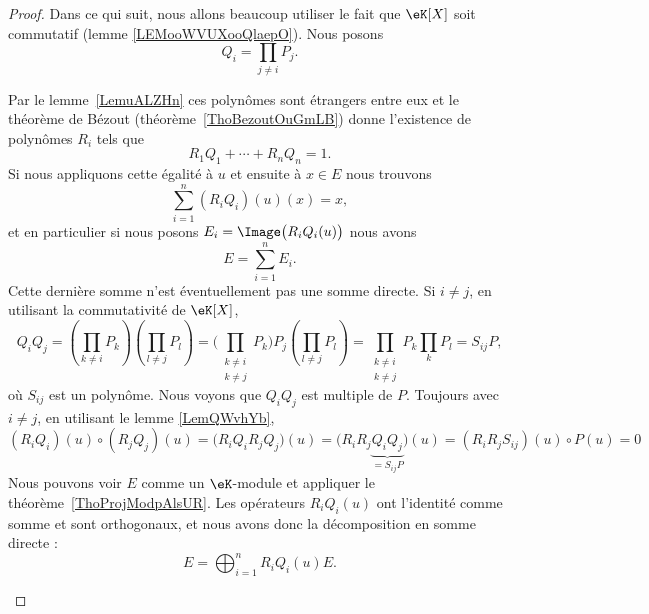 \begin{proof}
	Dans ce qui suit, nous allons beaucoup utiliser le fait que \( \eK[X]\) soit commutatif (lemme \ref{LEMooWVUXooQlaepO}). Nous posons
	\begin{equation}
		Q_i=\prod_{j\neq i}P_j.
	\end{equation}
	\begin{subproof}

		Par le lemme~\ref{LemuALZHn} ces polynômes sont étrangers entre eux et le théorème de Bézout (théorème~\ref{ThoBezoutOuGmLB}) donne l'existence de polynômes \( R_i\) tels que
		\begin{equation}        \label{EQooMMCVooRzlXpA}
			R_1Q_1+\cdots+R_nQ_n=1.
		\end{equation}
		Si nous appliquons cette égalité à \( u\) et ensuite à \( x\in E\) nous trouvons
		\begin{equation}        \label{EqqVcpUy}
			\sum_{i=1}^n(R_iQ_i)(u)(x)=x,
		\end{equation}
		et en particulier si nous posons \( E_i=\Image\big(R_iQ_i(u)\big)\) nous avons
		\begin{equation}
			E=\sum_{i=1}^nE_i.
		\end{equation}
		Cette dernière somme n'est éventuellement pas une somme directe.
		Si \( i\neq j\), en utilisant la commutativité de \( \eK[X]\),
		\begin{equation}
			Q_iQ_j=\left(\prod_{k\neq i}P_k\right)\left(\prod_{l\neq j}P_l\right)=\Big( \prod_{\substack{k\neq i\\k\neq j}}P_k \Big)P_j\left( \prod_{l\neq j}P_l \right)=\prod_{\substack{k\neq i\\k\neq j}}P_k\prod_kP_l=S_{ij}P,
		\end{equation}
		où \( S_{ij}\) est un polynôme. Nous voyons que \( Q_iQ_j\) est multiple de \( P\).
		Toujours avec \( i\neq j\), en utilisant le lemme \ref{LemQWvhYb},
		\begin{equation}
			(R_iQ_i)(u)\circ (R_jQ_j)(u)=\big( R_iQ_iR_jQ_j \big)(u)=\big( R_iR_j\underbrace{Q_iQ_j}_{=S_{ij}P} \big)(u)=(R_iR_jS_{ij})(u)\circ P(u)=0
		\end{equation}
		Nous pouvons voir \( E\) comme un \( \eK\)-module et appliquer le théorème~\ref{ThoProjModpAlsUR}. Les opérateurs \( R_iQ_i(u)\) ont l'identité comme somme et sont orthogonaux, et nous avons donc la décomposition en somme directe :
		\begin{equation}        \label{EQooJPQLooOZepwZ}
			E=\bigoplus_{i=1}^nR_iQ_i(u)E.
		\end{equation}


\end{subproof}
\end{proof}
